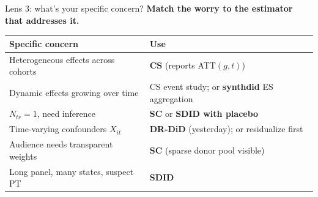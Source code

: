 \documentclass[aspectratio=169,11pt]{beamer}
\begin{document}
\begin{frame}{Lens 3: what's your specific concern?}
\footnotesize
\textbf{Match the worry to the estimator that addresses it.}

\vspace{0.3em}
\begin{center}
\renewcommand{\arraystretch}{1.2}
\begin{tabular}{p{} l}
\toprule
\textbf{Specific concern} & \textbf{Use} \\
\midrule
Heterogeneous effects across cohorts & \textbf{CS} (reports ATT$(g,t)$) \\
Dynamic effects growing over time & CS event study; or \textbf{synthdid} ES aggregation \\
$N_{tr} = 1$, need inference & \textbf{SC} or \textbf{SDID with placebo} \\
Time-varying confounders $X_{it}$ & \textbf{DR-DiD} (yesterday); or residualize first \\
Audience needs transparent weights & \textbf{SC} (sparse donor pool visible) \\
Long panel, many states, suspect PT & \textbf{SDID} \\
\bottomrule
\end{tabular}
\end{center}

\vspace{0.4em}
\end{frame}
\end{document}
